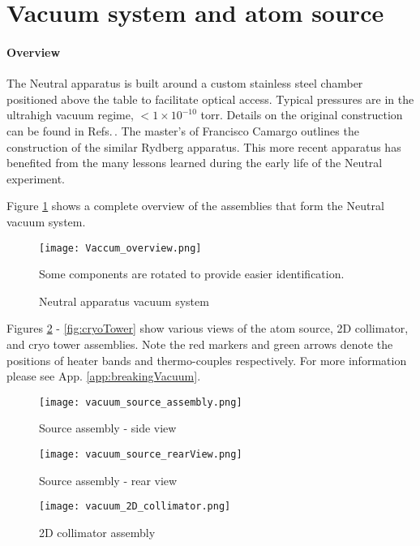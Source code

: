 \pagebreak
\section{Vacuum system and atom source} \label{sec:vac}
\setcounter{footnote}{0}
\paragraph{Overview}
	
The Neutral apparatus is built around a custom stainless steel chamber positioned above the table to facilitate optical access.
Typical pressures are in the ultrahigh vacuum regime, $<1\times10^{-10}$ torr. 
Details on the original construction can be found in Refs.\,\cite{MartinezdeEscolar2010,Mickelson2010b}. 
The master's of Francisco Camargo \cite{Camargo2015} outlines the construction of the similar Rydberg apparatus. This more recent apparatus has benefited from the many lessons learned during the early life of the Neutral experiment.

Figure \ref{fig:vacuumSystem} shows a complete overview of the assemblies that form the Neutral vacuum system.
	\begin{figure} 
		\centerline{
		\texttt{[image: Vaccum\_overview.png]}}
		\caption{Neutral apparatus vacuum system}{Some components are rotated to provide easier identification.}
		\label{fig:vacuumSystem}
	\end{figure}		
Figures \ref{fig:sourceSideView} - \ref{fig:cryoTower} show various views of the atom source, 2D collimator, and cryo tower assemblies. Note the red markers and green arrows denote the positions of heater bands and thermo-couples respectively. For more information please see App. \ref{app:breakingVacuum}.
	\begin{figure} 
		\centerline{
		\texttt{[image: vacuum\_source\_assembly.png]}}
		\caption{Source assembly - side view}
		\label{fig:sourceSideView}
	\end{figure}
	
	\begin{figure} 
		\centerline{
		\texttt{[image: vacuum\_source\_rearView.png]}}
		\caption{Source assembly - rear view}
		\label{fig:sourceRearView}
	\end{figure}
	
	\begin{figure} 
		\centerline{
		\texttt{[image: vacuum\_2D\_collimator.png]}}
		\caption{2D collimator assembly}
		\label{fig:assembly_2Dcoll}
	\end{figure}
	
